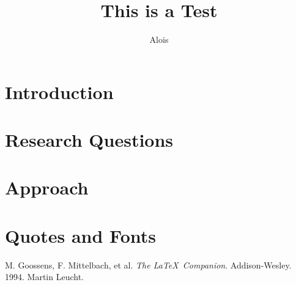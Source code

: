 \documentclass[11pt]{article}
\title{This is a Test}
\author{Alois}
\begin{document}
\maketitle
\clearpage
\tableofcontents
\clearpage


\section{Introduction}
\label{sec:introduction}


\section{Research Questions}
\label{sec:rq}


\section{Approach}
\label{sec:approach}


\section{Quotes and Fonts}
\label{sec:qf}


\begin{thebibliography}{99}
 M. Goossens, F. Mittelbach, et al. \emph{The \LaTeX\ Companion}. Addison-Wesley. 1994.
 Martin Leucht.
\end{thebibliography}
\end{document}
